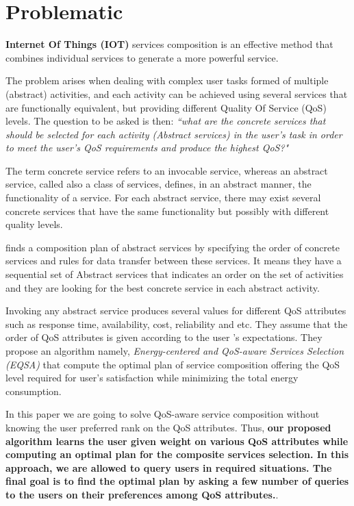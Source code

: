 \documentclass[10pt,journal,compsoc]{IEEEtran}
\begin{document}
\section{Problematic}

\textbf{Internet Of Things (IOT)} services composition is an effective method that combines individual services to generate a more powerful service. 

The problem arises when dealing with complex user tasks formed of multiple (abstract) activities, and each activity can be achieved using several services that are functionally equivalent, but providing different Quality Of Service (QoS) levels. The question to be asked is then:  \emph{``what are the concrete services that should be selected for each activity (Abstract services) in the user's task in order to meet the user's QoS requirements and produce the highest QoS?"}

The term concrete service refers to an invocable service, whereas an abstract service, called also a class of services, defines, in an abstract manner, the functionality of a service. For each abstract service, there may exist several concrete services that have the same functionality but possibly with different quality levels.  

\cite{DBLP:journals/tase/KhanoucheACKY16} finds a composition plan of abstract services by specifying the order of concrete services and rules for data transfer between these services. It means they have a sequential set of Abstract services that indicates an order on the set of activities and they are looking for the best concrete service in each abstract activity. 

Invoking any abstract service produces several values for different QoS attributes such as response time, availability, cost, reliability and etc. They assume that the order of QoS attributes is given according to the user 's expectations. They propose an algorithm namely, \emph{Energy-centered and QoS-aware Services Selection (EQSA)} that compute the optimal plan of service composition offering the QoS level required for user's satisfaction while minimizing the total energy consumption.

In this paper we are going to solve QoS-aware service composition without knowing the user preferred rank on the QoS attributes. Thus, \textbf{our proposed algorithm learns the user given weight on various QoS attributes while computing an optimal plan for the composite services selection. In this approach, we are allowed to query users in required situations. The final goal is to find the optimal plan by asking a few number of queries to the users on their preferences among QoS attributes.}.
\end{document}
